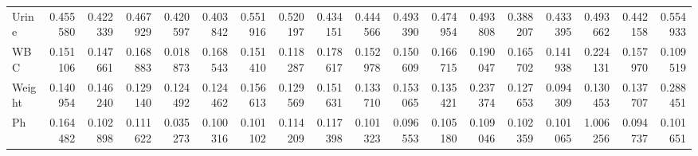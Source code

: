 \begin{tabular}{lrrrrrrrrrrrrrrrrr}
Urine & 0.455580 & 0.422339 & 0.467929 & 0.420597 & 0.403842 & 0.551916 & 0.520197 & 0.434151 & 0.444566 & 0.493390 & 0.474954 & 0.493808 & 0.388207 & 0.433395 & 0.493662 & 0.442158 & 0.554933 \\
WBC & 0.151106 & 0.147661 & 0.168883 & 0.018873 & 0.168543 & 0.151410 & 0.118287 & 0.178617 & 0.152978 & 0.150609 & 0.166715 & 0.190047 & 0.165702 & 0.141938 & 0.224131 & 0.157970 & 0.109519 \\
Weight & 0.140954 & 0.146240 & 0.129140 & 0.124492 & 0.124462 & 0.156613 & 0.129569 & 0.151631 & 0.133710 & 0.153065 & 0.135421 & 0.237374 & 0.127653 & 0.094309 & 0.130453 & 0.137707 & 0.288451 \\
Ph & 0.164482 & 0.102898 & 0.111622 & 0.035273 & 0.100316 & 0.101102 & 0.114209 & 0.117398 & 0.101323 & 0.096553 & 0.105180 & 0.109046 & 0.102359 & 0.101065 & 1.006256 & 0.094737 & 0.101651 \\
\bottomrule
\end{tabular}
